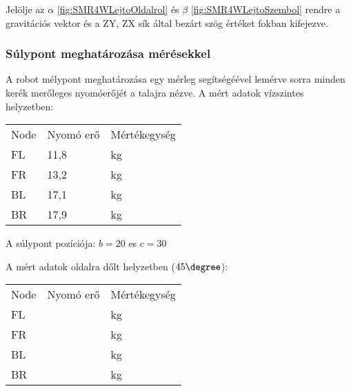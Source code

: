 \renewcommand{\img}{SajatRobot/SzerkAbrak/MerolegesNyomoEro.jpg}
\renewcommand{\sources}{*}
\renewcommand{\captionn}{Merőleges nyomóerő a talajra $4W-SSMR$ típusú robot esetében.}
\renewcommand{\figlabel}{SMR4WMerolegesNyomoero}


Jelölje az $\alpha$ \ref{fig:SMR4WLejtoOldalrol} és $\beta$ \ref{fig:SMR4WLejtoSzembol} rendre a gravitációs vektor és a ZY, ZX sík által bezárt szög értéket fokban kifejezve. 

\renewcommand{\img}{SajatRobot/SzerkAbrak/LejtoOldalrol.jpg}
\renewcommand{\sources}{*}
\renewcommand{\captionn}{$4W-SSMR$ típusú robot lejtőn felfele oldal nézetből.}
\renewcommand{\aspectratioPic}{0.5}
\renewcommand{\figlabel}{SMR4WLejtoOldalrol}


\renewcommand{\img}{SajatRobot/SzerkAbrak/LejtoSzembol.png}
\renewcommand{\sources}{*}
\renewcommand{\captionn}{$4W-SSMR$ típusú robot lejtőn első nézetből.}
\renewcommand{\aspectratioPic}{0.5}
\renewcommand{\figlabel}{SMR4WLejtoSzembol}






\subsubsection{Súlypont meghatározása mérésekkel}

A robot mélypont meghatározása egy mérleg segítségéével lemérve sorra minden kerék merőleges nyomóerőjét a talajra nézve. 
A mért adatok vízszintes helyzetben:

\begin{table}[H]
\center
\begin{tabular}{lll}
Node  & Nyomó erő & Mértékegység \\
FL &   11,8      & kg          \\
FR &   13,2      & kg          \\
BL &   17,1      & kg          \\
BR &   17,9      & kg            
\end{tabular}
\end{table}

A súlypont pozíciója: $b = 20$ es $c = 30 $

A mért adatok oldalra dőlt helyzetben ($45 \degree $):

\begin{table}[H]
\center
\begin{tabular}{lll}
Node  & Nyomó erő & Mértékegység \\
FL &          & kg          \\
FR &          & kg          \\
BL &          & kg          \\
BR &          & kg            
\end{tabular}
\end{table}

